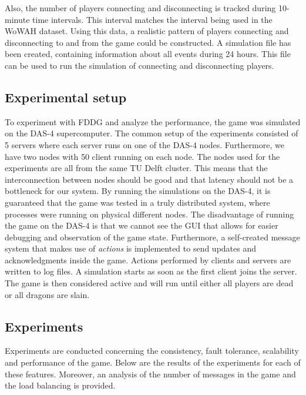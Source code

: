 Also, the number of players connecting and disconnecting is tracked during 10-minute time intervals.
This interval matches the interval being used in the WoWAH dataset.
Using this data, a realistic pattern of players connecting and disconnecting to and from the game could be constructed.
A simulation file has been created, containing information about all events during 24 hours. This file can be used to run the simulation of connecting and disconnecting players.

\subsection{Experimental setup}
\label{subsec:experimental_setup}

To experiment with FDDG and analyze the performance, the game was simulated on the DAS-4 supercomputer.
The common setup of the experiments consisted of 5 servers where each server runs on one of the DAS-4 nodes. Furthermore, we have two nodes with 50 client running on each node.
The nodes used for the experiments are all from the same TU Delft cluster.
This means that the interconnection between nodes should be good and that latency should not be a bottleneck for our system.
By running the simulations on the DAS-4, it is guaranteed that the game was tested in a truly distributed system, where processes were running on physical different nodes.
The disadvantage of running the game on the DAS-4 is that we cannot see the GUI that allows for easier debugging and observation of the game state.
Furthermore, a self-created message system that makes use of \emph{actions} is implemented to send updates and acknowledgments inside the game. Actions performed by clients and servers are written to log files.
A simulation starts as soon as the first client joins the server. The game is then considered active and will run until either all players are dead or all dragons are slain.


\subsection{Experiments}
\label{subsec:experiments}
	Experiments are conducted concerning the consistency, fault tolerance, scalability and performance of the game. Below are the results of the experiments for each of these features. Moreover, an analysis of the number of messages in the game and the load balancing is provided.

